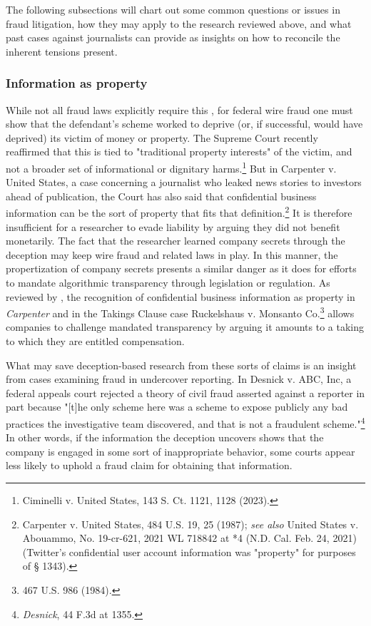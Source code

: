 The following subsections will chart out some common questions or issues in fraud litigation, how they may apply to the research reviewed above, and what past cases against journalists can provide as insights on how to reconcile the inherent tensions present.

\subsubsection{Information as property}
While not all fraud laws explicitly require this \cite{podgor_criminal_1999}, for federal wire fraud one must show that the defendant's scheme worked to deprive (or, if successful, would have deprived) its victim of money or property. The Supreme Court recently reaffirmed that this is tied to "traditional property interests" of the victim, and not a broader set of informational or dignitary harms.\footnote{Ciminelli v. United States, 143 S. Ct. 1121, 1128 (2023).} But in Carpenter v. United States, a case concerning a journalist who leaked news stories to investors ahead of publication, the Court has also said that confidential business information can be the sort of property that fits that definition.\footnote{Carpenter v. United States, 484 U.S. 19, 25 (1987); \textit{see also} United States v. Abouammo, No. 19-cr-621, 2021 WL 718842 at *4 (N.D. Cal. Feb. 24, 2021) (Twitter's confidential user account information was "property" for purposes of § 1343).} It is therefore insufficient for a researcher to evade liability by arguing they did not benefit monetarily. The fact that the researcher learned company secrets through the deception may keep wire fraud and related laws in play. In this manner, the propertization of company secrets presents a similar danger as it does for efforts to mandate algorithmic transparency through legislation or regulation. As reviewed by \cite{kapczynski2020}, the recognition of confidential business information as property in \textit{Carpenter} and in the Takings Clause case Ruckelshaus v. Monsanto Co.\footnote{467 U.S. 986 (1984).} allows companies to challenge mandated transparency by arguing it amounts to a taking to which they are entitled compensation.

What may save deception-based research from these sorts of claims is an insight from cases examining fraud in undercover reporting. In Desnick v. ABC, Inc, a federal appeals court rejected a theory of civil fraud asserted against a reporter in part because "[t]he only scheme here was a scheme to expose publicly any bad practices the investigative team discovered, and that is not a fraudulent scheme."\footnote{\textit{Desnick}, 44 F.3d at 1355.} In other words, if the information the deception uncovers shows that the company is engaged in some sort of inappropriate behavior, some courts appear less likely to uphold a fraud claim for obtaining that information.

